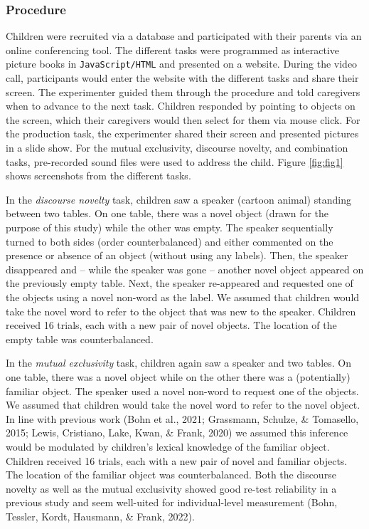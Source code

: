 \documentclass[
  man,floatsintext]{apa6}
\begin{document}
\hypertarget{procedure}{%
\subsubsection{Procedure}\label{procedure}}

Children were recruited via a database and participated with their parents via an online conferencing tool. The different tasks were programmed as interactive picture books in \texttt{JavaScript/HTML} and presented on a website. During the video call, participants would enter the website with the different tasks and share their screen. The experimenter guided them through the procedure and told caregivers when to advance to the next task. Children responded by pointing to objects on the screen, which their caregivers would then select for them via mouse click. For the production task, the experimenter shared their screen and presented pictures in a slide show. For the mutual exclusivity, discourse novelty, and combination tasks, pre-recorded sound files were used to address the child. Figure \ref{fig:fig1} shows screenshots from the different tasks.

In the \emph{discourse novelty} task, children saw a speaker (cartoon animal) standing between two tables. On one table, there was a novel object (drawn for the purpose of this study) while the other was empty. The speaker sequentially turned to both sides (order counterbalanced) and either commented on the presence or absence of an object (without using any labels). Then, the speaker disappeared and -- while the speaker was gone -- another novel object appeared on the previously empty table. Next, the speaker re-appeared and requested one of the objects using a novel non-word as the label. We assumed that children would take the novel word to refer to the object that was new to the speaker. Children received 16 trials, each with a new pair of novel objects. The location of the empty table was counterbalanced.

In the \emph{mutual exclusivity} task, children again saw a speaker and two tables. On one table, there was a novel object while on the other there was a (potentially) familiar object. The speaker used a novel non-word to request one of the objects. We assumed that children would take the novel word to refer to the novel object. In line with previous work (Bohn et al., 2021; Grassmann, Schulze, \& Tomasello, 2015; Lewis, Cristiano, Lake, Kwan, \& Frank, 2020) we assumed this inference would be modulated by children's lexical knowledge of the familiar object. Children received 16 trials, each with a new pair of novel and familiar objects. The location of the familiar object was counterbalanced. Both the discourse novelty as well as the mutual exclusivity showed good re-test reliability in a previous study and seem well-uited for individual-level measurement (Bohn, Tessler, Kordt, Hausmann, \& Frank, 2022).
\end{document}
